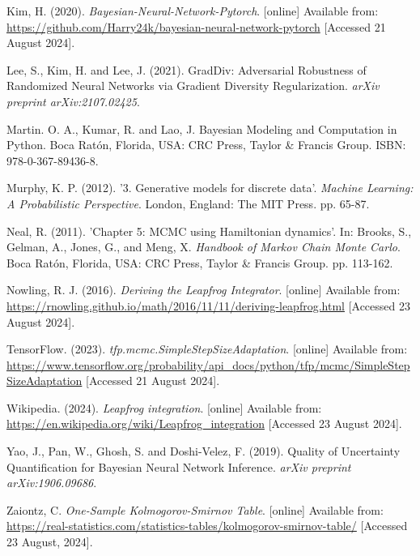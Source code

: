 \documentclass[conference]{IEEEtran}
\begin{document}
\begin{thebibliography}{00}
 Kim, H. (2020). \textit{Bayesian-Neural-Network-Pytorch}. [online] Available from: \url{https://github.com/Harry24k/bayesian-neural-network-pytorch} [Accessed 21 August 2024].

 Lee, S., Kim, H. and Lee, J. (2021). GradDiv: Adversarial Robustness of Randomized Neural Networks via Gradient Diversity Regularization. \textit{arXiv preprint arXiv:2107.02425}.

 Martin. O. A., Kumar, R. and Lao, J. Bayesian Modeling and Computation in Python. Boca Ratón, Florida, USA: CRC Press, Taylor \& Francis Group. ISBN: 978-0-367-89436-8.

 Murphy, K. P. (2012). '3. Generative models for discrete data'. \textit{Machine Learning: A Probabilistic Perspective}. London, England: The MIT Press. pp. 65-87.

 Neal, R. (2011). 'Chapter 5: MCMC using Hamiltonian dynamics'. In: Brooks, S., Gelman, A., Jones, G., and Meng, X. \textit{Handbook of Markov Chain Monte Carlo}. Boca Ratón, Florida, USA: CRC Press, Taylor \& Francis Group. pp. 113-162.

 Nowling, R. J. (2016). \textit{Deriving the Leapfrog Integrator}. [online] Available from: \url{https://rnowling.github.io/math/2016/11/11/deriving-leapfrog.html} [Accessed 23 August 2024].

 TensorFlow. (2023). \textit{tfp.mcmc.SimpleStepSizeAdaptation}. [online] Available from: \url{https://www.tensorflow.org/probability/api_docs/python/tfp/mcmc/SimpleStepSizeAdaptation} [Accessed 21 August 2024].

 Wikipedia. (2024). \textit{Leapfrog integration}. [online] Available from: \url{https://en.wikipedia.org/wiki/Leapfrog_integration} [Accessed 23 August 2024].

 Yao, J., Pan, W., Ghosh, S. and Doshi-Velez, F. (2019). Quality of Uncertainty Quantification for Bayesian Neural Network Inference. \textit{arXiv preprint arXiv:1906.09686}.

 Zaiontz, C. \textit{One-Sample Kolmogorov-Smirnov Table}. [online] Available from: \url{https://real-statistics.com/statistics-tables/kolmogorov-smirnov-table/} [Accessed 23 August, 2024].

\end{thebibliography}
\vspace{12pt}
\end{document}
